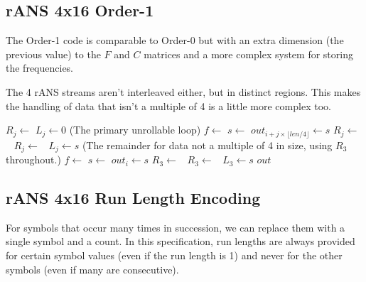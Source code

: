 \documentclass[a4paper]{article}
\begin{document}
\subsection{rANS 4x16 Order-1}

The Order-1 code is comparable to Order-0 but with an extra dimension
(the previous value) to the $F$ and $C$ matrices and a more complex
system for storing the frequencies.

The 4 rANS streams aren't interleaved either, but in distinct regions.
This makes the handling of data that isn't a multiple of 4 is a little
more complex too.

\begin{algorithmic}[1]
  \State {}
    \State $R_j \gets$ 
    \State $L_j \gets 0$
  \EndFor
  \Statex (The primary unrollable loop)
        \State $f \gets$ 
      \State $s \gets$ 
      \State $out_{i + j \times \lfloor len/4 \rfloor} \gets s$
      \State $R_j \gets$\ 
      \State $R_j \gets$\ 
      \State $L_j \gets s$
    \EndFor
  \EndFor
  \Statex (The remainder for data not a multiple of 4 in size, using $R_3$ throughout.)
    \State $f \gets$ 
    \State $s \gets$ 
    \State $out_i \gets s$
    \State $R_3 \gets$\ 
    \State $R_3 \gets$\ 
    \State $L_3 \gets s$
  \EndFor
  \State \Return $out$
\EndFunction
\end{algorithmic}

\subsection{rANS 4x16 Run Length Encoding}
\label{sec:ransRLE}

For symbols that occur many times in succession, we can replace them
with a single symbol and a count.  In this specification, run lengths
are always provided for certain symbol values (even if the run length
is 1) and never for the other symbols (even if many are consecutive).
\end{document}
